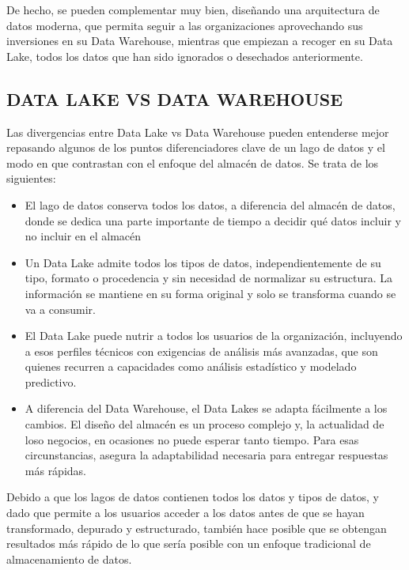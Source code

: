 \documentclass[preprint,12pt]{elsarticle}
\begin{document}
De hecho, se pueden complementar muy bien, diseñando una arquitectura de datos moderna, que permita seguir a las organizaciones aprovechando sus inversiones en su Data Warehouse, mientras que empiezan a recoger en su Data Lake, todos los datos que han sido ignorados o desechados anteriormente.


\subsection{DATA LAKE VS DATA WAREHOUSE}
	
Las divergencias entre Data Lake vs Data Warehouse pueden entenderse mejor repasando algunos de los puntos diferenciadores clave de un lago de datos y el modo en que contrastan con el enfoque del almacén de datos. Se trata de los siguientes:\\

\begin{itemize}

\item El lago de datos conserva todos los datos, a diferencia del almacén de datos, donde se dedica una parte importante de tiempo a decidir qué datos incluir y no incluir en el almacén
\item Un Data Lake admite todos los tipos de datos, independientemente de su tipo, formato o procedencia y sin necesidad de normalizar su estructura. La información se mantiene en su forma original y solo se transforma cuando se va a consumir.
\item El Data Lake puede nutrir a todos los usuarios de la organización, incluyendo a esos perfiles técnicos con exigencias de análisis más avanzadas, que son quienes recurren a capacidades como análisis estadístico y modelado predictivo.
\item A diferencia del Data Warehouse, el Data Lakes se adapta fácilmente a los cambios. El diseño del almacén es un proceso complejo y, la actualidad de loso negocios, en ocasiones no puede esperar tanto tiempo. Para esas circunstancias, asegura la adaptabilidad necesaria para entregar respuestas más rápidas.\\
\end{itemize}

Debido a que los lagos de datos contienen todos los datos y tipos de datos, y dado que permite a los usuarios acceder a los datos antes de que se hayan transformado, depurado y estructurado, también hace posible que se obtengan resultados más rápido de lo que sería posible con un enfoque tradicional de almacenamiento de datos.
\end{document}
